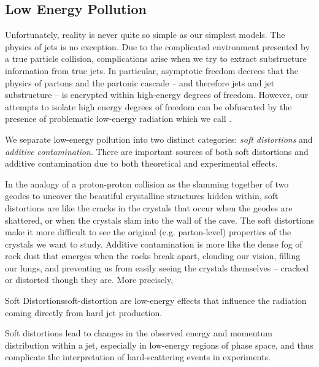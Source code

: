 \subsection{Low Energy Pollution}
\label{sec:low-energy-pollution}

Unfortunately, reality is never quite so simple as our simplest models.
%
The physics of jets is no exception.
%
Due to the complicated environment presented by a true particle collision, complications arise when we try to extract substructure information from true jets.
%
In particular, asymptotic freedom decrees that the physics of partons and the partonic cascade -- and therefore jets and jet substructure -- is encrypted within high-energy degrees of freedom.
%
However, our attempts to isolate high energy degrees of freedom can be obfuscated by the presence of problematic low-energy radiation which we call .

We separate low-energy pollution into two distinct categories:
%
\textit{soft distortions} and \textit{additive contamination}.
%
There are important sources of both soft distortions and additive contamination due to both theoretical and experimental effects.

In the analogy of a proton-proton collision as the slamming together of two geodes to uncover the beautiful crystalline structures hidden within, soft distortions are like the cracks in the crystals that occur when the geodes are shattered, or when the crystals slam into the wall of the cave.
%
The soft distortions make it more difficult to see the original (e.g. parton-level) properties of the crystals we want to study.
%
Additive contamination is more like the dense fog of rock dust that emerges when the rocks break apart, clouding our vision, filling our lungs, and preventing us from easily seeing the crystals themselves -- cracked or distorted though they are.
%
More precisely,

\begin{definitionbox}{Soft Distortions}{soft-distortion}
     are low-energy effects that influence the radiation coming directly from hard jet production.

    Soft distortions lead to changes in the observed energy and momentum distribution within a jet, especially in low-energy regions of phase space, and thus complicate the interpretation of hard-scattering events in experiments.
\end{definitionbox}


